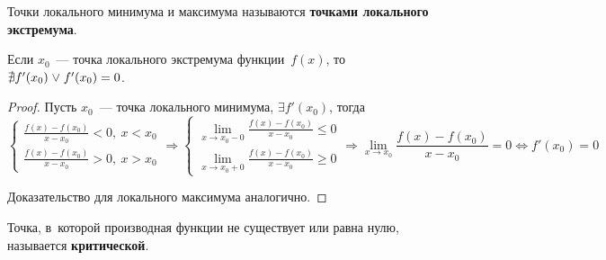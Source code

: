  Точки локального минимума и максимума называются \textbf{точками локального экстремума}.

\begin{theorem}
Если $x_0$~--- точка локального экстремума функции~$f(x)$, то $\nexists f'(x_0) \mathrel{\lor} f'(x_0) = 0$.
\end{theorem}
\begin{proof}
Пусть $x_0$~--- точка локального минимума, $\exists f'(x_0)$, тогда
\begin{equation*}
\begin{cases}
\displaystyle \frac{f(x) - f(x_0)}{x - x_0} < 0, \ x < x_0 \\
\displaystyle \frac{f(x) - f(x_0)}{x - x_0} > 0, \ x > x_0
\end{cases} \Rightarrow
\begin{cases}
\displaystyle \lim_{x \to x_0-0} \frac{f(x) - f(x_0)}{x - x_0} \leqslant 0 \\
\displaystyle \lim_{x \to x_0+0} \frac{f(x) - f(x_0)}{x - x_0} \geqslant 0
\end{cases} \Rightarrow
\lim_{x \to x_0} \frac{f(x) - f(x_0)}{x - x_0} = 0 \Leftrightarrow
f'(x_0) = 0
\end{equation*}

Доказательство для локального максимума аналогично.
\end{proof}

 Точка, в~которой производная функции не существует или равна нулю, называется \textbf{критической}.

